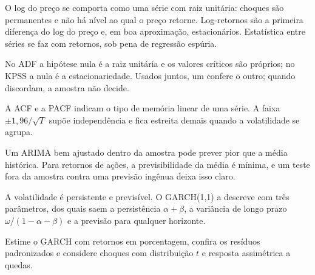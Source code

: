 \begin{resumo}
  \item O log do preço se comporta como uma série com raiz unitária: choques são permanentes e não há nível ao qual o preço retorne. Log-retornos são a primeira diferença do log do preço e, em boa aproximação, estacionários. Estatística entre séries se faz com retornos, sob pena de regressão espúria.
  \item No ADF a hipótese nula é a raiz unitária e os valores críticos são próprios; no KPSS a nula é a estacionariedade. Usados juntos, um confere o outro; quando discordam, a amostra não decide.
  \item A ACF e a PACF indicam o tipo de memória linear de uma série. A faixa $\pm 1,96/\sqrt{T}$ supõe independência e fica estreita demais quando a volatilidade se agrupa.
  \item Um ARIMA bem ajustado dentro da amostra pode prever pior que a média histórica. Para retornos de ações, a previsibilidade da média é mínima, e um teste fora da amostra contra uma previsão ingênua deixa isso claro.
  \item A volatilidade é persistente e previsível. O GARCH(1,1) a descreve com três parâmetros, dos quais saem a persistência $\alpha+\beta$, a variância de longo prazo $\omega/(1-\alpha-\beta)$ e a previsão para qualquer horizonte.
  \item Estime o GARCH com retornos em porcentagem, confira os resíduos padronizados e considere choques com distribuição $t$ e resposta assimétrica a quedas.
\end{resumo}

